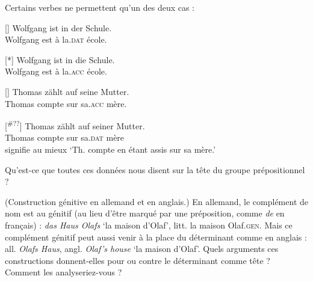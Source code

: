 {   \noindent Certains verbes ne permettent qu’un des deux cas :

    \begin{exe}
    []{
    \gll   Wolfgang ist in der Schule.\\
    Wolfgang est à la.\textsc{dat} école.\\}

    [*]{
    \gll   Wolfgang ist in die Schule. \\
    Wolfgang est à la.\textsc{acc} école.\\}

    []{
    \gll Thomas zählt auf seine Mutter.\\
    Thomas compte sur sa.\textsc{acc} mère.\\}

    [\textsuperscript{\#??}]{
    \gll Thomas zählt auf seiner Mutter.\\
    Thomas compte sur sa.\textsc{dat} mère \\
    \glt    signifie au mieux ‘Th. compte en étant assis sur sa mère.’}
    \end{exe}

    \noindent Qu’est-ce que toutes ces données nous disent sur la tête du groupe prépositionnel ?

     ({Construction génitive en allemand et en anglais.}) En allemand, le complément de nom est au génitif (au lieu d’être marqué par une préposition, comme \textit{de} en français) : \textit{das Haus Olafs} ‘la maison d’Olaf’, litt. la maison Olaf.\textsc{gen}. Mais ce complément génitif peut aussi venir à la place du déterminant comme en anglais : all. \textit{Olafs Haus}, angl. \textit{Olaf’s house} ‘la maison d’Olaf’. Quels arguments ces constructions donnent-elles pour ou contre le déterminant comme tête ? Comment les analyseriez-vous ?
}
